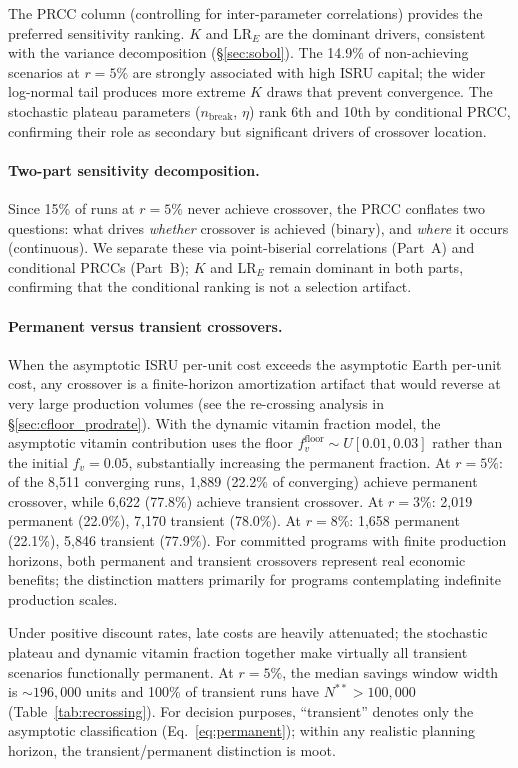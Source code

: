 \documentclass[5p,twocolumn]{elsarticle}
\begin{document}
The PRCC column (controlling for inter-parameter correlations) provides the preferred sensitivity ranking. $K$ and LR$_E$ are the dominant drivers, consistent with the variance decomposition (\S\ref{sec:sobol}). The 14.9\% of non-achieving scenarios at $r = 5\%$ are strongly associated with high ISRU capital; the wider log-normal tail produces more extreme $K$ draws that prevent convergence. The stochastic plateau parameters ($n_{\mathrm{break}}$, $\eta$) rank 6th and 10th by conditional PRCC, confirming their role as secondary but significant drivers of crossover location.

\paragraph{Two-part sensitivity decomposition.} Since 15\% of runs at $r = 5\%$ never achieve crossover, the PRCC conflates two questions: what drives \emph{whether} crossover is achieved (binary), and \emph{where} it occurs (continuous). We separate these via point-biserial correlations (Part~A) and conditional PRCCs (Part~B); $K$ and LR$_E$ remain dominant in both parts, confirming that the conditional ranking is not a selection artifact.

\paragraph{Permanent versus transient crossovers.} When the asymptotic ISRU per-unit cost exceeds the asymptotic Earth per-unit cost, any crossover is a finite-horizon amortization artifact that would reverse at very large production volumes (see the re-crossing analysis in \S\ref{sec:cfloor_prodrate}). With the dynamic vitamin fraction model, the asymptotic vitamin contribution uses the floor $f_v^{\mathrm{floor}} \sim U[0.01, 0.03]$ rather than the initial $f_v = 0.05$, substantially increasing the permanent fraction. At $r = 5\%$: of the 8{,}511 converging runs, 1{,}889 (22.2\% of converging) achieve permanent crossover, while 6{,}622 (77.8\%) achieve transient crossover. At $r = 3\%$: 2{,}019 permanent (22.0\%), 7{,}170 transient (78.0\%). At $r = 8\%$: 1{,}658 permanent (22.1\%), 5{,}846 transient (77.9\%). For committed programs with finite production horizons, both permanent and transient crossovers represent real economic benefits; the distinction matters primarily for programs contemplating indefinite production scales.

Under positive discount rates, late costs are heavily attenuated; the stochastic plateau and dynamic vitamin fraction together make virtually all transient scenarios functionally permanent. At $r = 5\%$, the median savings window width is ${\sim}196{,}000$ units and 100\% of transient runs have $N^{**} > 100{,}000$ (Table~\ref{tab:recrossing}). For decision purposes, ``transient'' denotes only the asymptotic classification (Eq.~\ref{eq:permanent}); within any realistic planning horizon, the transient/permanent distinction is moot.
\end{document}
